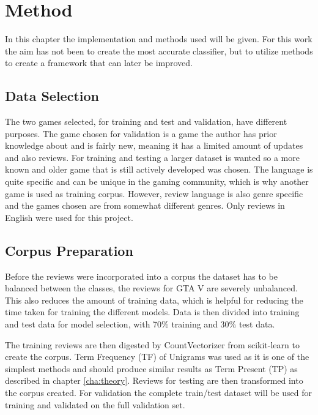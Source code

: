 \chapter{Method}
\label{cha:method}


In this chapter the implementation and methods used will be given. 
For this work the aim has not been to create the most accurate classifier, but to utilize methods to create a framework that can later be improved.


\section{Data Selection}
\label{sec:data-selection}


The two games selected, for training and test and validation, have different purposes. 
The game chosen for validation is a game the author has prior knowledge about and is fairly new, meaning it has a limited amount of updates and also reviews. 
For training and testing a larger dataset is wanted so a more known and older game that is still actively developed was chosen. 
The language is quite specific and can be unique in the gaming community, which is why another game is used as training corpus. 
However, review language is also genre specific and the games chosen are from somewhat different genres.
Only reviews in English were used for this project.


\section{Corpus Preparation}
\label{sec:corpus-preparation}


Before the reviews were incorporated into a corpus the dataset has to be balanced between the classes, the reviews for GTA V are severely unbalanced.
This also reduces the amount of training data, which is helpful for reducing the time taken for training the different models.
Data is then divided into training and test data for model selection, with 70\% training and 30\% test data.


The training reviews are then digested by CountVectorizer from scikit-learn to create the corpus. 
Term Frequency (TF) of Unigrams was used as it is one of the simplest methods and should produce similar results as Term Present (TP) as described in chapter \autoref{cha:theory}. 
Reviews for testing are then transformed into the corpus created. 
For validation the complete train/test dataset will be used for training and validated on the full validation set.


